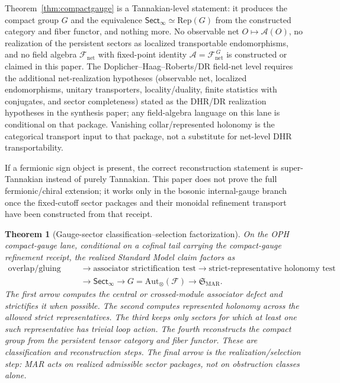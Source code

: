 \documentclass[11pt]{article}
\newtheorem{theorem}{Theorem}[section]
\begin{document}
Theorem~\ref{thm:compactgauge} is a Tannakian-level statement: it produces the compact group
\(G\) and the equivalence \(\mathsf{Sect}_\infty\simeq\mathrm{Rep}(G)\) from the constructed
category and fiber functor, and nothing more. No observable net \(O\mapsto\mathcal A(O)\),
no realization of the persistent sectors as localized transportable endomorphisms, and no field
algebra \(\mathcal F_{\mathrm{net}}\) with fixed-point identity \(\mathcal A=\mathcal
F_{\mathrm{net}}^{\,G}\) is constructed or claimed in this paper. The Doplicher--Haag--Roberts/DR
field-net level requires the additional net-realization hypotheses (observable net, localized
endomorphisms, unitary transporters, locality/duality, finite statistics with conjugates, and
sector completeness) stated as the DHR/DR realization hypotheses in the synthesis paper; any
field-algebra language on this lane is conditional on that package. Vanishing collar/represented
holonomy is the categorical transport input to that package, not a substitute for net-level DHR
transportability.

If a fermionic sign object is present, the correct reconstruction statement is super-Tannakian
instead of purely Tannakian. This paper does not prove the full fermionic/chiral extension; it
works only in the bosonic internal-gauge branch once the fixed-cutoff sector packages and their
monoidal refinement transport have been constructed from that receipt.

\begin{theorem}[Gauge-sector classification--selection factorization]\label{thm:gauge-selection-factorization}
On the OPH compact-gauge lane, conditional on a cofinal tail carrying the compact-gauge refinement
receipt, the realized Standard Model claim factors as
\[
\begin{aligned}
\text{overlap/gluing data}
&\longrightarrow \text{associator strictification test}
\longrightarrow \text{strict-representative holonomy test}\\
&\longrightarrow \mathsf{Sect}_\infty
\longrightarrow G=\mathrm{Aut}_\otimes(\mathcal F)
\longrightarrow \mathfrak S_{\mathrm{MAR}}.
\end{aligned}
\]
The first arrow computes the central or crossed-module associator defect and strictifies it when
possible. The second computes represented holonomy across the allowed strict representatives. The
third keeps only sectors for which at least one such representative has trivial loop action. The fourth reconstructs the compact
group from the persistent tensor category and fiber functor. These are classification and
reconstruction steps. The final arrow is the realization/selection step: MAR acts on realized
admissible sector packages, not on obstruction classes alone.
\end{theorem}
\end{document}

